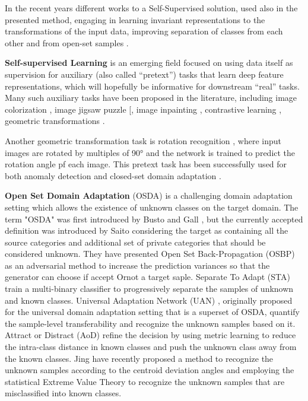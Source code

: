 \documentclass[10pt,twocolumn,letterpaper]{article}
\begin{document}
In the recent years different works to a Self-Supervised solution, used also in the 
presented method, engaging in learning invariant representations to the 
transformations of the input data, improving separation of classes from each other 
and from open-set samples \cite{dhamija2021selfsupervised,jia2021selfsupervised,GeoTran}.

\textbf{Self-supervised Learning} is an emerging field focused on using 
data itself as supervision for auxiliary (also called “pretext”) 
tasks that learn deep feature representations, which will hopefully be informative 
for downstream “real” tasks.
Many such auxiliary tasks have been proposed in the literature, including
image colorization \cite{zhang2016colorful},
image jigsaw puzzle [\cite{noroozi2017unsupervised}, image inpainting \cite{pathak2016context},
contrastive learning \cite{oord2019representation}, geometric transformations \cite{dosovitskiy2015discriminative}.

Another geometric transformation task is rotation recognition \cite{OldROS}, where input images
are rotated by multiples of 90° and the network is trained to predict the rotation
angle pf each image. This pretext task has been successfully used for both anomaly
detection \cite{GeoTran} and closed-set domain adaptation \cite{SelfSupervisedXu}.

\textbf{Open Set Domain Adaptation} (OSDA) is a challenging domain adaptation 
setting which allows the existence of unknown classes on the target domain.
The term "OSDA" was first introduced by Busto and Gall \cite{firstosda}, but the 
currently accepted definition was introduced by Saito \etal \cite{saito2018open} considering the target as 
containing all the source categories and additional set of private categories 
that should be considered unknown. They have presented Open Set
Back-Propagation (OSBP) \cite{saito2018open} as an adversarial method 
to increase the prediction variances so that the generator can choose if accept Ornot a target saple.
Separate To Adapt (STA) \cite{sat} train a multi-binary classifier to progressively 
separate the samples of unknown and known classes.
Universal Adaptation Network (UAN) \cite{uan}, originally proposed for the universal 
domain adaptation setting that is a superset of OSDA, quantify the sample-level 
transferability and recognize the unknown samples based on it.
Attract or Distract (AoD) \cite{feng2019attract} refine the decision by using 
metric learning to reduce the intra-class distance in known classes and push 
the unknown class away from the known classes.
Jing \etal \cite{Jing_Li_Zhu_Ding_Lu_Yang_2021} have recently proposed a method
to recognize the unknown samples according to the centroid deviation angles and
employing the statistical Extreme Value Theory to recognize the unknown 
samples that are misclassified into known classes.
\end{document}

